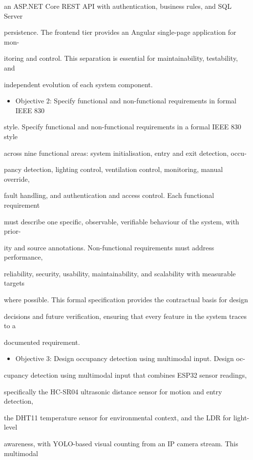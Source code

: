 an ASP.NET Core REST API with authentication, business rules, and SQL Server

persistence. The frontend tier provides an Angular single-page application for mon-

itoring and control. This separation is essential for maintainability, testability, and

independent evolution of each system component.

\begin{itemize}
  \item Objective 2: Specify functional and non-functional requirements in formal IEEE 830
\end{itemize}
style. Specify functional and non-functional requirements in a formal IEEE 830 style

across nine functional areas: system initialisation, entry and exit detection, occu-

pancy detection, lighting control, ventilation control, monitoring, manual override,

fault handling, and authentication and access control. Each functional requirement

must describe one speciﬁc, observable, veriﬁable behaviour of the system, with prior-

ity and source annotations. Non-functional requirements must address performance,

reliability, security, usability, maintainability, and scalability with measurable targets

where possible. This formal speciﬁcation provides the contractual basis for design

decisions and future veriﬁcation, ensuring that every feature in the system traces to a

documented requirement.

\begin{itemize}  \item Objective 3: Design occupancy detection using multimodal input. Design oc-
\end{itemize}cupancy detection using multimodal input that combines ESP32 sensor readings,

speciﬁcally the HC-SR04 ultrasonic distance sensor for motion and entry detection,

the DHT11 temperature sensor for environmental context, and the LDR for light-level

awareness, with YOLO-based visual counting from an IP camera stream. This multimodal

